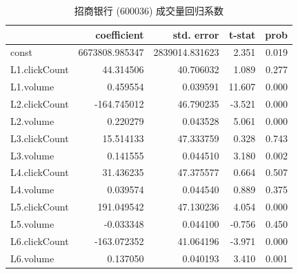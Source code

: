 \begin{table}
  \centering
  \caption{招商银行 (600036) 成交量回归系数}
  \label{forecast:2}
  \begin{tabular}{lrrrr}
    \toprule
    & coefficient & std. error & t-stat & prob \\
    \midrule
    const & 6673808.985347 & 2839014.831623 & 2.351 & 0.019 \\
    L1.clickCount & 44.314506 & 40.706032 & 1.089 & 0.277 \\
    L1.volume & 0.459554 & 0.039591 & 11.607 & 0.000 \\
    L2.clickCount & -164.745012 & 46.790235 & -3.521 & 0.000 \\
    L2.volume & 0.220279 & 0.043528 & 5.061 & 0.000 \\
    L3.clickCount & 15.514133 & 47.333759 & 0.328 & 0.743 \\
    L3.volume & 0.141555 & 0.044510 & 3.180 & 0.002 \\
    L4.clickCount & 31.436235 & 47.375577 & 0.664 & 0.507 \\
    L4.volume & 0.039574 & 0.044540 & 0.889 & 0.375 \\
    L5.clickCount & 191.049542 & 47.130236 & 4.054 & 0.000 \\
    L5.volume & -0.033348 & 0.044100 & -0.756 & 0.450 \\
    L6.clickCount & -163.072352 & 41.064196 & -3.971 & 0.000 \\
    L6.volume & 0.137050 & 0.040193 & 3.410 & 0.001 \\
    \bottomrule
  \end{tabular}
\end{table}

